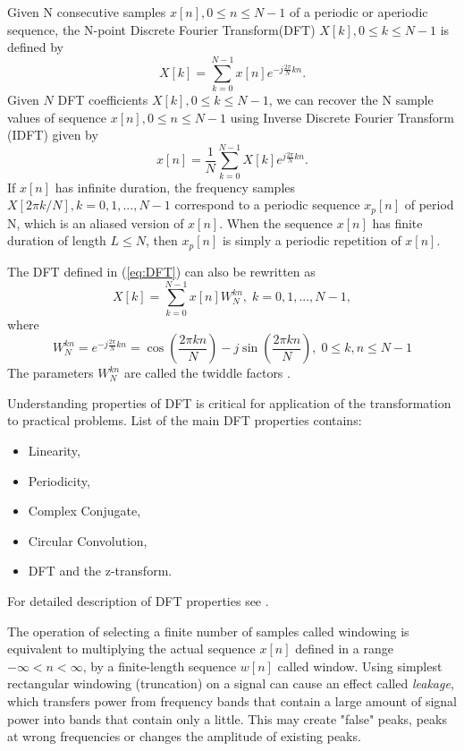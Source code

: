 \documentclass[twoside]{ctuthesis}
\theoremstyle{plain}
\theoremstyle{definition}
\theoremstyle{note}
\begin{document}
Given N consecutive samples $x[n], 0 \leq n \leq N-1$ of a periodic or aperiodic sequence, the N-point Discrete Fourier Transform(DFT) $X[k], 0 \leq k \leq N-1$ is defined by
\begin{equation} \label{eq:DFT}
X[k]=\sum_{k=0}^{N-1}x[n]e^{-j \frac{2 \pi}{N} kn}.
\end{equation}
Given $N$ DFT coefficients $X[k], 0 \leq k \leq N-1$, we can recover the N sample values of sequence $x[n], 0 \leq n \leq N-1$ using Inverse Discrete Fourier Transform (IDFT) given by
\begin{equation} \label{eq:IDFT}
x[n]=\frac{1}{N} \sum_{k=0}^{N-1}X[k]e^{j \frac{2 \pi}{N} kn}.
\end{equation}
If $x[n]$ has infinite duration, the frequency samples  $X[2 \pi k/ N], k=0, 1, ..., N-1$ correspond to a periodic sequence $x_{p}[n]$ of period N, which is an aliased version of $x[n]$. When the sequence $x[n]$ has finite duration of length $L \leq N$, then  $x_{p}[n]$ is simply a periodic repetition of $x[n]$.

The DFT defined in (\ref{eq:DFT}) can also be rewritten as
\begin{equation} \label{eq:DFT2}
X[k]=\sum_{k=0}^{N-1}x[n]W^{kn}_{N},\; k = 0, 1, ..., N-1,
\end{equation}
where
\begin{equation} \label{eq:Twiddle}
W^{kn}_{N}=e^{-j \frac{2 \pi}{N} kn}=\cos(\frac{2\pi kn}{N})-j\sin(\frac{2\pi kn}{N}), \;0\leq k,n\leq N-1
\end{equation}
The parameters $W^{kn}_{N}$ are called the twiddle factors \cite{cite:RT_DSP}.
\par
Understanding properties of DFT is critical for application of the transformation to practical problems. List of the main DFT properties contains:
\begin{itemize}
	\setlength{\itemsep}{5pt}
\item Linearity,

\item Periodicity,

\item Complex Conjugate,

\item Circular Convolution,

\item DFT and the z-transform.
\end{itemize}
For detailed description of DFT properties see \cite{cite:2,cite:RT_DSP}.

The operation of selecting a finite number of samples called windowing is equivalent to multiplying the actual sequence $x[n]$ defined in a range $-\infty < n < \infty$, by a finite-length sequence $w[n]$ called window. Using simplest rectangular windowing (truncation) on a signal can cause an effect called \textit{leakage}, which transfers power from frequency bands that contain a large amount of signal power into bands that contain only a little. This may create "false" peaks, peaks at wrong frequencies or changes the amplitude of existing peaks. 
\end{document}
